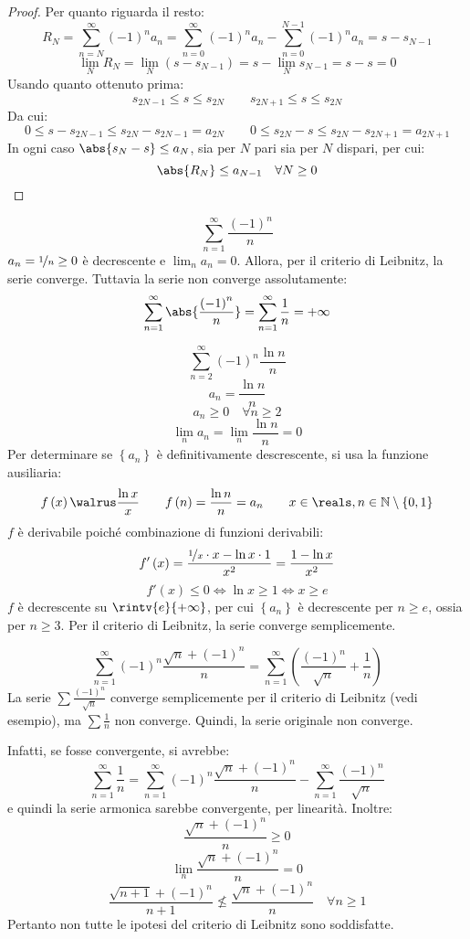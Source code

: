 \begin{proof}
  Per quanto riguarda il resto:
  $$R_N=\sum_{n=N}^\infty\left( -1 \right)^na_n=\sum_{n=0}^\infty\left( -1 \right)^na_n-\sum_{n=0}^{N-1}\left( -1 \right)^na_n=s-s_{N-1}$$
  $$\lim_NR_N=\lim_N\left( s-s_{N-1} \right)=s-\lim_Ns_{N-1}=s-s=0$$
  Usando quanto ottenuto prima:
  $$s_{2N-1}\le s\le s_{2N}\qquad s_{2N+1}\le s\le s_{2N}$$
  Da cui:
  $$0\le s-s_{2N-1}\le s_{2N}-s_{2N-1}=a_{2N}\qquad 0\le s_{2N}-s\le s_{2N}-s_{2N+1}=a_{2N+1}$$
  In ogni caso $\abs{s_N-s}\le a_N$, sia per $N$ pari sia per $N$ dispari, per cui:
  $$\abs{R_N}\le a_{N-1}\quad \forall N\ge0$$
\end{proof}

\begin{example}
  $$\sum_{n=1}^\infty\frac{\left( -1 \right)^n}{n}$$
  $a_n=\nicefrac{1}{n}\ge0$ è decrescente e $\lim_na_n=0$. Allora, per il criterio di Leibnitz, la serie converge.
  Tuttavia la serie non converge assolutamente:
  $$\sum_{n=1}^\infty\abs{\frac{\left( -1 \right)^n}{n}}=\sum_{n=1}^\infty\frac{1}{n}=+\infty$$
\end{example}

\begin{example}
  $$\sum_{n=2}^\infty\left( -1 \right)^n\frac{\ln n}{n}$$
  $$a_n=\frac{\ln n}{n}$$
  $$a_n\ge0\quad \forall n\ge2$$
  $$\lim_na_n=\lim_n\frac{\ln n}{n}=0$$
  Per determinare se $\left\{ a_n \right\}$ è definitivamente descrescente, si usa la funzione ausiliaria:
  $$f\left( x \right)\walrus \frac{\ln x}{x}\qquad f\left( n \right)=\frac{\ln n}{n}=a_n\qquad x\in\reals,n\in\mathbb{N}\setminus\left\{ 0,1 \right\}$$
  $f$ è derivabile poiché combinazione di funzioni derivabili:
  $$f'\left( x \right)=\frac{\nicefrac{1}{x}\cdot x-\ln x\cdot 1}{x^2}=\frac{1-\ln x}{x^2}$$
  $$f'\left( x \right)\le0\iff \ln x\ge 1\iff x\ge e$$
  $f$ è decrescente su $\rintv{e}{+\infty}$, per cui $\left\{ a_n \right\}$ è decrescente per $n\ge e$, ossia per $n\ge3$.
  Per il criterio di Leibnitz, la serie converge semplicemente.
\end{example}

\begin{example}
  $$\sum_{n=1}^\infty\left( -1 \right)^n\frac{\sqrt{n}+\left( -1 \right)^n}{n}=\sum_{n=1}^\infty\left( \frac{\left( -1 \right)^n}{\sqrt{n}}+\frac{1}{n} \right)$$
  La serie $\sum\frac{\left( -1 \right)^n}{\sqrt{n}}$ converge semplicemente per il criterio di Leibnitz (vedi esempio), ma $\sum \frac{1}{n}$ non converge.
  Quindi, la serie originale non converge. 
  
  Infatti, se fosse convergente, si avrebbe:
  $$\sum_{n=1}^\infty\frac{1}{n}=\sum_{n=1}^\infty\left( -1 \right)^n\frac{\sqrt{n}+\left( -1 \right)^n}{n}-\sum_{n=1}^\infty\frac{\left( -1 \right)^n}{\sqrt{n}}$$
  e quindi la serie armonica sarebbe convergente, per linearità.
  Inoltre:
  $$\frac{\sqrt{n}+\left( -1 \right)^n}{n}\ge0$$
  $$\lim_n\frac{\sqrt{n}+\left( -1 \right)^n}{n}=0$$
  $$\frac{\sqrt{n+1}+\left( -1 \right)^n}{n+1}\nleq \frac{\sqrt{n}+\left( -1 \right)^n}{n}\quad \forall n\ge1$$
  Pertanto non tutte le ipotesi del criterio di Leibnitz sono soddisfatte.
\end{example}

